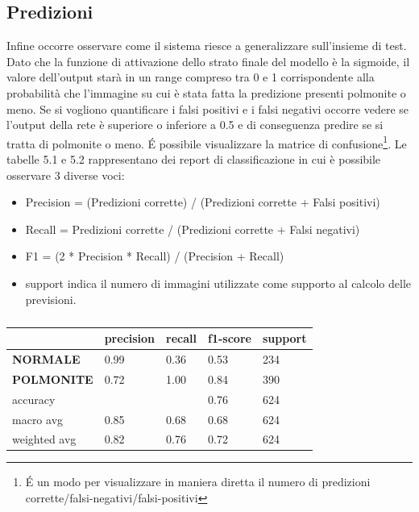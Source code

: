 \subsection{Predizioni}
Infine occorre osservare come il sistema riesce a generalizzare sull’insieme di test. 
Dato che la funzione di attivazione dello strato finale del modello è la sigmoide, 
il valore dell’output starà in un range compreso tra 0 e 1 corrispondente alla probabilità che l’immagine
 su cui è stata fatta la predizione presenti polmonite o meno. 
Se si vogliono quantificare i falsi positivi e i falsi negativi occorre vedere se l’output della 
rete è superiore o inferiore a 0.5  e di conseguenza predire se si tratta di polmonite o meno.
 É possibile visualizzare la matrice di confusione\footnote{É un modo per visualizzare in maniera 
 diretta il numero di predizioni corrette/falsi-negativi/falsi-positivi}. 
 Le tabelle 5.1 e 5.2 rappresentano dei report di classificazione in cui è possibile osservare 3 diverse voci:
\begin{itemize}
  \item Precision = (Predizioni corrette) / (Predizioni corrette + Falsi positivi)
  \item Recall = Predizioni corrette / (Predizioni corrette + Falsi negativi)
  \item F1 = (2 * Precision * Recall) / (Precision + Recall)
  \item support indica il numero di immagini utilizzate come supporto al calcolo delle previsioni.
\end{itemize}
% 



  \begin{table}[hb!]
  \begin{tabular}{@{}l|llll@{}}
    \toprule
                     & \textbf{precision} & \textbf{recall} & \textbf{f1-score} & \textbf{support} \\ \midrule
  \textbf{NORMALE}   & 0.99               & 0.36            & 0.53              & 234              \\
  \textbf{POLMONITE} & 0.72               & 1.00            & 0.84              & 390              \\ \midrule
  accuracy           &                    &                 & 0.76              & 624              \\
  macro avg          & 0.85               & 0.68            & 0.68              & 624              \\
  weighted avg       & 0.82               & 0.76            & 0.72              & 624              \\ \bottomrule
  \end{tabular}
  \caption{}
\end{table} 
  
